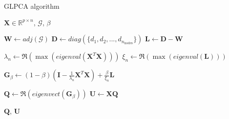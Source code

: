 \documentclass[sigconf]{acmart}
\begin{document}
  \begin{algorithm}
  \caption{GLPCA algorithm}\label{alg:glpca}
  \begin{algorithmic}
      \Require $\mathbf{X} \in \mathbb{R}^{p \times n}$, $\mathcal{G}$,  $\beta$
      
      \State $\mathbf{W} \gets adj(\mathcal{G})$
      \State $\mathbf{D} \gets diag(\{d_1, d_2, ..., d_{n_{\text{nodes}}}\})$
      \State $\mathbf{L} \gets \mathbf{D} - \mathbf{W}$
      
      \State $\lambda_n \gets \Re(\max(eigenval(\mathbf{X}^T\mathbf{X})))$
      \State $\xi_n \gets \Re(\max(eigenval(\mathbf{L})))$
      
      \State $\mathbf{G}_{\beta} \gets (1 - \beta)(\mathbf{I} - \frac{1} {\lambda_n}\mathbf{X}^T\mathbf{X}) + \frac{\beta}{\xi_n}\mathbf{L}$
      
      \State $\mathbf{Q} \gets \Re{(eigenvect(\mathbf{G}_{\beta}))}$
      \State $\mathbf{U} \gets \mathbf{XQ}$
      
      \State \Return $\mathbf{Q}$, $\mathbf{U}$
  \end{algorithmic}
  \end{algorithm}
  
\end{document}
